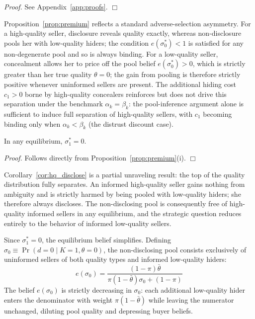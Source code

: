 \documentclass[10pt,letterpaper]{bp-template-concise}
\begin{document}
\noindent\textit{Proof.} See Appendix~\ref{app:proofs}. $\Box$

Proposition~\ref{prop:premium} reflects a standard adverse-selection asymmetry. For a high-quality seller, disclosure reveals quality exactly, whereas non-disclosure pools her with low-quality hiders; the condition $e(\sigma_0^*)<1$ is satisfied for any non-degenerate pool and so is always binding. For a low-quality seller, concealment allows her to price off the pool belief $e(\sigma_0^*)>0$, which is strictly greater than her true quality $\theta=0$; the gain from pooling is therefore strictly positive whenever uninformed sellers are present. The additional hiding cost $c_1>0$ borne by high-quality concealers reinforces but does not drive this separation under the benchmark $\alpha_k=\beta_k$: the pool-inference argument alone is sufficient to induce full separation of high-quality sellers, with $c_1$ becoming binding only when $\alpha_k < \beta_k$ (the distrust discount case).

\begin{corollary}
\label{cor:hq_disclose}
In any equilibrium, $\sigma_1^*=0$.
\end{corollary}

\noindent\textit{Proof.} Follows directly from Proposition~\ref{prop:premium}(i). $\Box$

Corollary~\ref{cor:hq_disclose} is a partial unraveling result: the top of the quality distribution fully separates. An informed high-quality seller gains nothing from ambiguity and is strictly harmed by being pooled with low-quality hiders; she therefore always discloses. The non-disclosing pool is consequently free of high-quality informed sellers in any equilibrium, and the strategic question reduces entirely to the behavior of informed low-quality sellers.

Since $\sigma_1^*=0$, the equilibrium belief simplifies. Defining $\sigma_0\equiv\Pr(d=0\mid K=1,\theta=0)$, the non-disclosing pool consists exclusively of uninformed sellers of both quality types and informed low-quality hiders:
\begin{equation}
    e(\sigma_0) = \frac{(1-\pi)\bar{\theta}}{\pi(1-\bar{\theta})\sigma_0 + (1-\pi)}
    \label{eq:belief_simplified}
\end{equation}
The belief $e(\sigma_0)$ is strictly decreasing in $\sigma_0$: each additional low-quality hider enters the denominator with weight $\pi(1-\bar{\theta})$ while leaving the numerator unchanged, diluting pool quality and depressing buyer beliefs.
\end{document}
